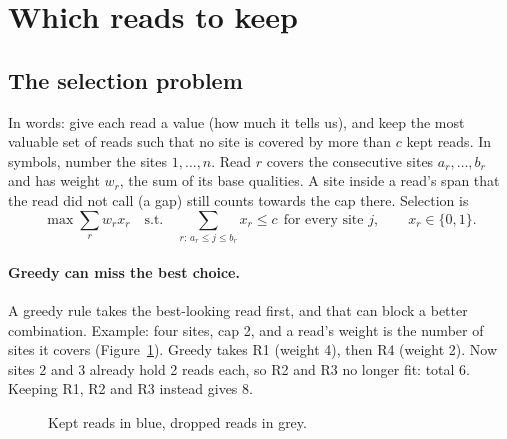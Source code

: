 \documentclass[11pt]{article}
\begin{document}
\section{Which reads to keep}\label{sec:whatshap}

\subsection{The selection problem}

In words: give each read a value (how much it tells us), and keep the most
valuable set of reads such that no site is covered by more than $c$ kept
reads. In symbols, number the sites $1,\dots,n$. Read $r$ covers the
consecutive sites $a_r,\dots,b_r$ and has weight $w_r$, the sum of its base
qualities. A site inside a read's span that the read did not call (a gap)
still counts towards the cap there. Selection is
\[
\max \sum_r w_r x_r \quad\text{s.t.}\quad \sum_{r:\,a_r\le j\le b_r} x_r\le c
\ \ \text{for every site } j,\qquad x_r\in\{0,1\}.
\]

\paragraph{Greedy can miss the best choice.} A greedy rule takes the
best-looking read first, and that can block a better combination. Example:
four sites, cap 2, and a read's weight is the number of sites it covers
(Figure~\ref{fig:greedy}). Greedy takes R1 (weight 4), then R4 (weight 2).
Now sites 2 and 3 already hold 2 reads each, so R2 and R3 no longer fit:
total 6. Keeping R1, R2 and R3 instead gives 8.

\begin{figure}[h]
\centering
{}
\caption{Kept reads in blue, dropped reads in grey.}
\label{fig:greedy}
\end{figure}
\end{document}
